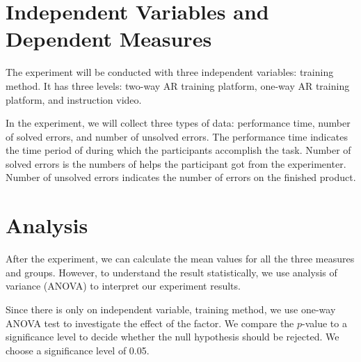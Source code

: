 \section{Independent Variables and Dependent Measures}

The experiment will be conducted with three independent variables: training method. It has three levels: two-way AR training platform, one-way AR training platform, and instruction video.

In the experiment, we will collect three types of data: performance time, number of solved errors, and number of unsolved errors.
The performance time indicates the time period of during which the participants accomplish the task.
Number of solved errors is the numbers of helps the participant got from the experimenter.
Number of unsolved errors indicates the number of errors on the finished product.

\section{Analysis}

After the experiment, we can calculate the mean values for all the three measures and groups. However, to understand the result statistically, we use analysis of variance (ANOVA) to interpret our experiment results.

Since there is only on independent variable, training method, we use one-way ANOVA test to investigate the effect of the factor. We compare the $p$-value to a significance level to decide whether the null hypothesis should be rejected. We choose a significance level of 0.05.
